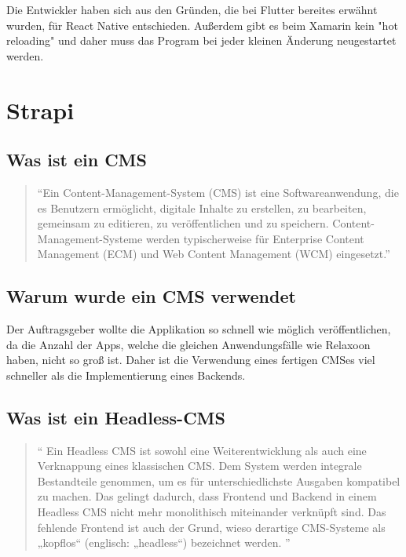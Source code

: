 \begin{spacing}{1}
    Die Entwickler haben sich aus den Gründen, die bei Flutter bereites erwähnt wurden, für React Native entschieden.
    Außerdem gibt es beim Xamarin kein "hot reloading" und daher muss das
    Program bei jeder kleinen Änderung neugestartet werden.\cite{xamarin-vs-react-native}







    \section{Strapi}

    \subsection{Was ist ein CMS}

    \begin{quotation}
        ``Ein Content-Management-System (CMS) ist eine Softwareanwendung,
        die es Benutzern ermöglicht, digitale Inhalte zu erstellen, zu bearbeiten, gemeinsam zu editieren,
        zu veröffentlichen und zu speichern. Content-Management-Systeme werden typischerweise für Enterprise
        Content Management (ECM) und Web Content Management (WCM) eingesetzt.''
        \cite{cms}
    \end{quotation}



    \subsection{Warum wurde ein CMS verwendet}
    Der Auftragsgeber wollte die Applikation so schnell wie möglich veröffentlichen,
    da die Anzahl der Apps, welche die gleichen Anwendungsfälle wie Relaxoon haben,
    nicht so groß ist.
    Daher ist die Verwendung eines fertigen CMSes viel schneller als
    die Implementierung eines Backends.

    \subsection{Was ist ein Headless-CMS}
    \begin{quotation}

        ``
        Ein Headless CMS ist sowohl eine Weiterentwicklung als
        auch eine Verknappung eines klassischen CMS. Dem System
        werden integrale Bestandteile genommen, um es für
        unterschiedlichste Ausgaben kompatibel zu machen.
        Das gelingt dadurch, dass Frontend und Backend in einem
        Headless CMS nicht mehr monolithisch miteinander verknüpft
        sind. Das fehlende Frontend ist auch der Grund,
        wieso derartige CMS-Systeme als
        „kopflos“ (englisch: „headless“) bezeichnet werden.
        '' \cite{headles-cms}
    \end{quotation}


\end{spacing}
